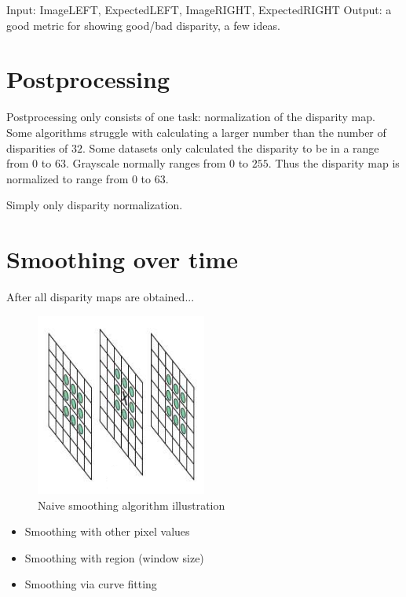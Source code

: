 Input: ImageLEFT, ExpectedLEFT, ImageRIGHT, ExpectedRIGHT
Output: a good metric for showing good/bad disparity, a few ideas.

\section{Postprocessing}

Postprocessing only consists of one task: normalization of the disparity map.
Some algorithms struggle with calculating a larger number than the number of disparities of $32$.
Some datasets only calculated the disparity to be in a range from $0$ to $63$.
Grayscale normally ranges from $0$ to $255$.
Thus the disparity map is normalized to range from $0$ to $63$.

Simply only disparity normalization.

\section{Smoothing over time}

After all disparity maps are obtained...

\begin{figure}[h!]
  \centering
  \includegraphics[width=0.5\textwidth]{src/images/naive-algo-impl.png}
  \caption[Naive smoothing algorithm illustration]{Naive smoothing algorithm illustration\protect\footnotemark}
  \label{fig:naive}
\end{figure}

\begin{itemize}
  \item Smoothing with other pixel values
  \item Smoothing with region (window size)
  \item Smoothing via curve fitting
\end{itemize}

